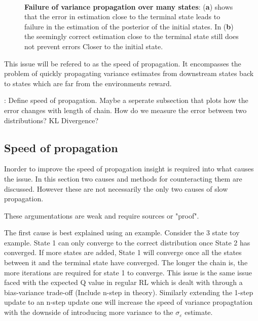 \begin{figure}[H]
    \centering
    \\
    \caption{\textbf{Failure of variance propagation over many states}: (\textbf{a}) shows that the error in estimation close to the terminal state leads to failure in the estimation of the posterior of the initial states. In (\textbf{b}) the seemingly correct estimation close to the terminal state still does not prevent errors Closer to the initial state.}
    \label{fig:longproptest}
\end{figure}

This issue will be refered to as the speed of propagation. It encompasses the problem of quickly propagating variance estimates from downstream states back to states which are far from the environments reward.

\todo: Define speed of propagation. Maybe a seperate subsection that plots how the error changes with length of chain. How do we measure the error between two distributions? KL Divergence?

\subsection{Speed of propagation}

Inorder to improve the speed of propagation insight is required into what causes the issue. In this section two causes and methods for counteracting them are discussed. However these are not necessarily the only two causes of slow propagation.

\todo These argumentations are weak and require sources or "proof". 

The first cause is best explained using an example. Consider the 3 state toy example. State 1 can only converge to the correct distribution once State 2 has converged. If more states are added, State 1 will converge once all the states between it and the terminal state have converged. The longer the chain is, the more iterations are required for state 1 to converge. This issue is the same issue faced with the expected Q value in regular RL which is dealt with through a bias-variance trade-off (\todo Include n-step in theory). Similarly extending the 1-step update to an n-step update one will increase the speed of variance propagtation with the downside of introducing more variance to the $\sigma_\varepsilon$ estimate.

